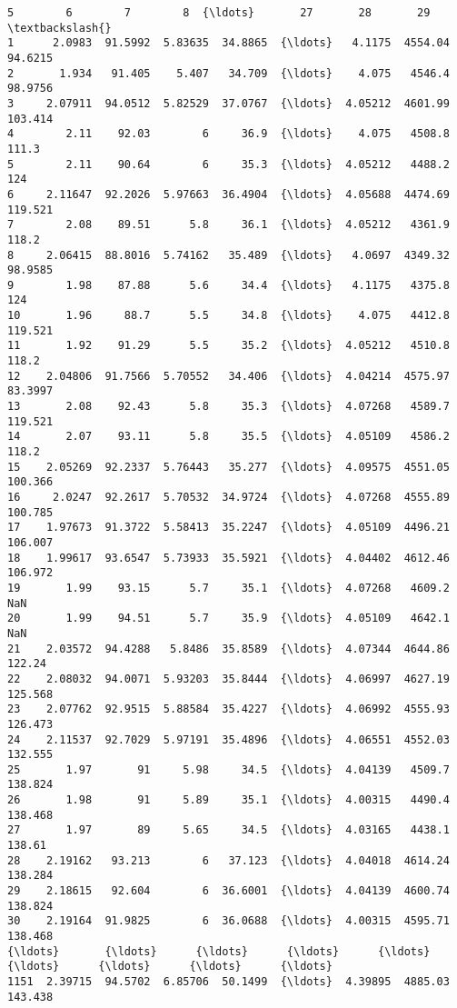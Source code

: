 \documentclass[11pt]{article}
\begin{document}
\begin{tcolorbox}[breakable, size=fbox, boxrule=.5pt, pad at break*=1mm, opacityfill=0]
\begin{Verbatim}[commandchars=\\\{\}]
            5        6        7        8  {\ldots}       27       28       29  \textbackslash{}
1      2.0983  91.5992  5.83635  34.8865  {\ldots}   4.1175  4554.04  94.6215
2       1.934   91.405    5.407   34.709  {\ldots}    4.075   4546.4  98.9756
3     2.07911  94.0512  5.82529  37.0767  {\ldots}  4.05212  4601.99  103.414
4        2.11    92.03        6     36.9  {\ldots}    4.075   4508.8    111.3
5        2.11    90.64        6     35.3  {\ldots}  4.05212   4488.2      124
6     2.11647  92.2026  5.97663  36.4904  {\ldots}  4.05688  4474.69  119.521
7        2.08    89.51      5.8     36.1  {\ldots}  4.05212   4361.9    118.2
8     2.06415  88.8016  5.74162   35.489  {\ldots}   4.0697  4349.32  98.9585
9        1.98    87.88      5.6     34.4  {\ldots}   4.1175   4375.8      124
10       1.96     88.7      5.5     34.8  {\ldots}    4.075   4412.8  119.521
11       1.92    91.29      5.5     35.2  {\ldots}  4.05212   4510.8    118.2
12    2.04806  91.7566  5.70552   34.406  {\ldots}  4.04214  4575.97  83.3997
13       2.08    92.43      5.8     35.3  {\ldots}  4.07268   4589.7  119.521
14       2.07    93.11      5.8     35.5  {\ldots}  4.05109   4586.2    118.2
15    2.05269  92.2337  5.76443   35.277  {\ldots}  4.09575  4551.05  100.366
16     2.0247  92.2617  5.70532  34.9724  {\ldots}  4.07268  4555.89  100.785
17    1.97673  91.3722  5.58413  35.2247  {\ldots}  4.05109  4496.21  106.007
18    1.99617  93.6547  5.73933  35.5921  {\ldots}  4.04402  4612.46  106.972
19       1.99    93.15      5.7     35.1  {\ldots}  4.07268   4609.2      NaN
20       1.99    94.51      5.7     35.9  {\ldots}  4.05109   4642.1      NaN
21    2.03572  94.4288   5.8486  35.8589  {\ldots}  4.07344  4644.86   122.24
22    2.08032  94.0071  5.93203  35.8444  {\ldots}  4.06997  4627.19  125.568
23    2.07762  92.9515  5.88584  35.4227  {\ldots}  4.06992  4555.93  126.473
24    2.11537  92.7029  5.97191  35.4896  {\ldots}  4.06551  4552.03  132.555
25       1.97       91     5.98     34.5  {\ldots}  4.04139   4509.7  138.824
26       1.98       91     5.89     35.1  {\ldots}  4.00315   4490.4  138.468
27       1.97       89     5.65     34.5  {\ldots}  4.03165   4438.1   138.61
28    2.19162   93.213        6   37.123  {\ldots}  4.04018  4614.24  138.284
29    2.18615   92.604        6  36.6001  {\ldots}  4.04139  4600.74  138.824
30    2.19164  91.9825        6  36.0688  {\ldots}  4.00315  4595.71  138.468
{\ldots}       {\ldots}      {\ldots}      {\ldots}      {\ldots}  {\ldots}      {\ldots}      {\ldots}      {\ldots}
1151  2.39715  94.5702  6.85706  50.1499  {\ldots}  4.39895  4885.03  143.438

\end{Verbatim}
\end{tcolorbox}
\end{document}
